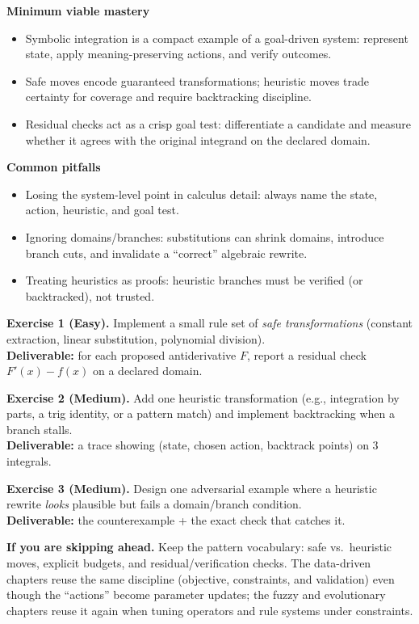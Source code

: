 \medskip
\begin{tcolorbox}[summarybox, title={Key takeaways}]
\textbf{Minimum viable mastery}
\begin{itemize}
    \item Symbolic integration is a compact example of a goal-driven system: represent state, apply meaning-preserving actions, and verify outcomes.
    \item Safe moves encode guaranteed transformations; heuristic moves trade certainty for coverage and require backtracking discipline.
    \item Residual checks act as a crisp goal test: differentiate a candidate and measure whether it agrees with the original integrand on the declared domain.
\end{itemize}
\medskip
\textbf{Common pitfalls}
\begin{itemize}
    \item Losing the system-level point in calculus detail: always name the state, action, heuristic, and goal test.
    \item Ignoring domains/branches: substitutions can shrink domains, introduce branch cuts, and invalidate a ``correct'' algebraic rewrite.
    \item Treating heuristics as proofs: heuristic branches must be verified (or backtracked), not trusted.
\end{itemize}
\end{tcolorbox}

\begin{tcolorbox}[summarybox, title={Exercises}]
\textbf{Exercise 1 (Easy).} Implement a small rule set of \emph{safe transformations} (constant extraction, linear substitution, polynomial division). \\
\textbf{Deliverable:} for each proposed antiderivative \(F\), report a residual check \(F'(x)-f(x)\) on a declared domain.

\smallskip
\textbf{Exercise 2 (Medium).} Add one heuristic transformation (e.g., integration by parts, a trig identity, or a pattern match) and implement backtracking when a branch stalls. \\
\textbf{Deliverable:} a trace showing (state, chosen action, backtrack points) on 3 integrals.

\smallskip
\textbf{Exercise 3 (Medium).} Design one adversarial example where a heuristic rewrite \emph{looks} plausible but fails a domain/branch condition. \\
\textbf{Deliverable:} the counterexample + the exact check that catches it.

\par\medskip
\noindent\textbf{If you are skipping ahead.} Keep the pattern vocabulary: safe vs.\ heuristic moves, explicit budgets, and residual/verification checks. The data-driven chapters reuse the same discipline (objective, constraints, and validation) even though the ``actions'' become parameter updates; the fuzzy and evolutionary chapters reuse it again when tuning operators and rule systems under constraints.
\end{tcolorbox}

